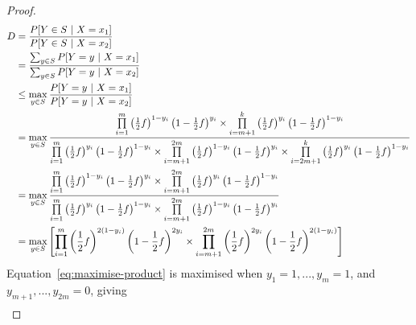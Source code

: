 \documentclass{article}
\begin{document}
\begin{enumerate}
\begin{proof}
	\begin{align}
		D &= \frac{P[Y\in S~|~X=x_1]}{P[Y\in S~|~X=x_2]}\\
			&= \frac{\sum_{y\in S}P[Y=y~|~X=x_1]}{\sum_{y\in S}P[Y=y~|~X=x_2]}\nonumber\\
			&\leq \max_{y\in S}\frac{P[Y=y~|~X=x_1]}{P[Y=y~|~X=x_2]}\nonumber\\
			&=\max_{y\in S}\frac{%
				\prod\limits_{i=1}^m \left(\frac{1}{2}f\right)^{1-y_i}\left(1-\frac{1}{2}f\right)^{y_i}%
				\times \prod\limits_{i=m+1}^k\left(\frac{1}{2}f\right)^{y_i} \left(1-\frac{1}{2}f\right)^{1-y_i}
			}{%
				\prod\limits_{i=1}^m \left(\frac{1}{2}f\right)^{y_i}\left(1-\frac{1}{2}f\right)^{1-y_i}%
				\times \prod\limits_{i=m+1}^{2m}\left(\frac{1}{2}f\right)^{1-y_i} \left(1-\frac{1}{2}f\right)^{y_i}\times%
				\prod\limits_{i=2m+1}^{k}\left(\frac{1}{2}f\right)^{y_i}\left(1-\frac{1}{2}f\right)^{1-y_i}
			}\nonumber\\
			&=\max_{y\in S}\frac{%
				\prod\limits_{i=1}^m \left(\frac{1}{2}f\right)^{1-y_i}\left(1-\frac{1}{2}f\right)^{y_i}%
				\times \prod\limits_{i=m+1}^{2m}\left(\frac{1}{2}f\right)^{y_i} \left(1-\frac{1}{2}f\right)^{1-y_i}%
			}{%
				\prod\limits_{i=1}^m \left(\frac{1}{2}f\right)^{y_i}\left(1-\frac{1}{2}f\right)^{1-y_i}%
				\times \prod\limits_{i=m+1}^{2m}\left(\frac{1}{2}f\right)^{1-y_i} \left(1-\frac{1}{2}f\right)^{y_i}%
			}\nonumber\\
			&=\max_{y\in S}\left[%
				\prod\limits_{i=1}^m \left(\frac{1}{2}f\right)^{2(1-y_i)}\left(1-\frac{1}{2}f\right)^{2y_i}%
				\times \prod\limits_{i=m+1}^{2m}\left(\frac{1}{2}f\right)^{2y_i} \left(1-\frac{1}{2}f\right)^{2(1-y_i)}\right]\label{eq:maximise-product}%
	\end{align}
	Equation~\ref{eq:maximise-product} is maximised when $y_1=1,...,y_m=1$, and $y_{m+1},...,y_{2m}=0$, giving
	\begin{align*}

\end{align*}
\end{proof}
\end{enumerate}
\end{document}
